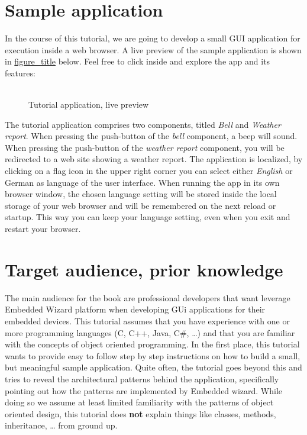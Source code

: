 \documentclass[
  a4paper,
,tablecaptionabove
]{scrbook}
\begin{document}
\hypertarget{_sample_application}{%
\section{Sample application}\label{_sample_application}}

In the course of this tutorial, we are going to develop a small GUI
application for execution inside a web browser. A live preview of the
sample application is shown in
\protect\hyperlink{fig:TutorialApp}{figure\_title} below. Feel free to
click inside and explore the app and its features:

\begin{figure}
\centering
\includegraphics{./../asciidoc/modules/ROOT/assets/images/icons/1x1.png}
\caption{Tutorial application, live preview}
\end{figure}

The tutorial application comprises two components, titled \emph{Bell}
and \emph{Weather report}. When pressing the push-button of the
\emph{bell} component, a beep will sound. When pressing the push-button
of the \emph{weather report} component, you will be redirected to a web
site showing a weather report. The application is localized, by clicking
on a flag icon in the upper right corner you can select either
\emph{English} or German as language of the user interface. When running
the app in its own browser window, the chosen language setting will be
stored inside the local storage of your web browser and will be
remembered on the next reload or startup. This way you can keep your
language setting, even when you exit and restart your browser.

\hypertarget{_target_audience_prior_knowledge}{%
\section{Target audience, prior
knowledge}\label{_target_audience_prior_knowledge}}

The main audience for the book are professional developers that want
leverage Embedded Wizard platform when developing GUi applications for
their embedded devices. This tutorial assumes that you have experience
with one or more programming languages (C, C++, Java, C\#, \ldots​) and
that you are familiar with the concepts of object oriented programming.
In the first place, this tutorial wants to provide easy to follow step
by step instructions on how to build a small, but meaningful sample
application. Quite often, the tutorial goes beyond this and tries to
reveal the architectural patterns behind the application, specifically
pointing out how the patterns are implemented by Embedded wizard. While
doing so we assume at least limited familiarity with the patterns of
object oriented design, this tutorial does \textbf{not} explain things
like classes, methods, inheritance, \ldots​ from ground up.
\end{document}
